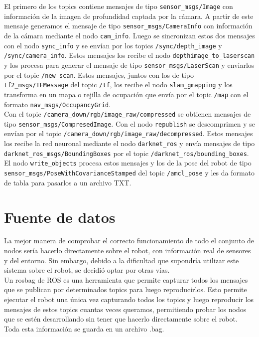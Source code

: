 El primero de los topics contiene mensajes de tipo \texttt{sensor\_msgs/Image} con información de la imagen de profundidad captada por la cámara. A partir de este mensaje generamos el mensaje de tipo \texttt{sensor\_msgs/CameraInfo} con información de la cámara mediante el nodo \texttt{cam\_info}. Luego se sincronizan estos dos mensajes con el nodo \texttt{sync\_info} y se envían por los topics \texttt{/sync/depth\_image} y \texttt{/sync/camera\_info}. Estos mensajes los recibe el nodo \texttt{depthimage\_to\_laserscan} y los procesa para generar el mensaje de tipo \texttt{sensor\_msgs/LaserScan} y enviarlos por el topic \texttt{/new\_scan}. Estos mensajes, juntos con los de tipo \texttt{tf2\_msgs/TFMessage} del topic \texttt{/tf}, los recibe el nodo \texttt{slam\_gmapping} y los transforma en un mapa o rejilla de ocupación que envía por el topic \texttt{/map} con el formato \texttt{nav\_msgs/OccupancyGrid}. \\

Con el topic \texttt{/camera\_down/rgb/image\_raw/compressed} se obtienen mensajes de tipo \texttt{sensor\_msgs/CompresedImage}. Con el nodo \texttt{republish} se descomprimen y se envían por el topic \texttt{/camera\_down/rgb/image\_raw/decompressed}. Estos mensajes los recibe la red neuronal mediante el nodo \texttt{darknet\_ros} y envía mensajes de tipo \texttt{darknet\_ros\_msgs/BoundingBoxes} por el topic \texttt{/darknet\_ros/bounding\_boxes}. El nodo \texttt{write\_objects} procesa estos mensajes y los de la pose del robot de tipo \texttt{sensor\_msgs/PoseWithCovarianceStamped} del topic \texttt{/amcl\_pose} y les da formato de tabla para pasarlos a un archivo TXT.\\


\section{Fuente de datos} \label{sec:datos}

La mejor manera de comprobar el correcto funcionamiento de todo el conjunto de nodos sería hacerlo directamente sobre el robot, con información real de sensores y del entorno. Sin embargo, debido a la dificultad que supondría utilizar este sistema sobre el robot, se decidió optar por otras vías.\\

Un  rosbag de ROS es una herramienta que permite capturar todos los mensajes que se publican por determinados topics para luego reproducirlos. Esto permite ejecutar el robot una única vez capturando todos los topics y luego reproducir los mensajes de estos topics cuantas veces queramos, permitiendo probar los nodos que se estén desarrollando sin tener que hacerlo directamente sobre el robot. Toda esta información se guarda en un archivo .bag.\\

